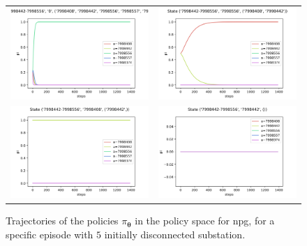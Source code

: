 \begin{figure}[!htp]
    \centering
    \begin{tabular}{cc}
        \includegraphics[height=0.27\textwidth,valign=b]{chapters/figures/policy_NPG_state_0.png} &
        \includegraphics[height=0.27\textwidth,valign=b]{chapters/figures/policy_NPG_state_1.png} \\
        \includegraphics[height=0.27\textwidth,valign=b]{chapters/figures/policy_NPG_state_2.png} &
        \includegraphics[height=0.27\textwidth,valign=b]{chapters/figures/policy_NPG_state_3.png}
    \end{tabular}
    \caption{Trajectories of the policies $\pi_{\boldsymbol \theta}$ in the policy space for \acrshort{npg}, for a specific episode with $5$ initially disconnected substation.}
    \label{fig:sequence-policies-npg}
\end{figure}

